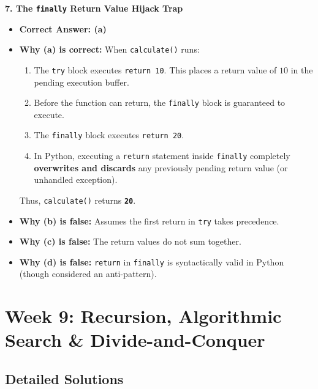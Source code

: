 \textbf{7. The \texttt{finally} Return Value Hijack Trap}
\begin{itemize}
    \item \textbf{Correct Answer: (a)}
    \item \textbf{Why (a) is correct:}
    When \texttt{calculate()} runs:
    \begin{enumerate}
        \item The \texttt{try} block executes \texttt{return 10}. This places a return value of $10$ in the pending execution buffer.
        \item Before the function can return, the \texttt{finally} block is guaranteed to execute.
        \item The \texttt{finally} block executes \texttt{return 20}.
        \item In Python, executing a \texttt{return} statement inside \texttt{finally} completely \textbf{overwrites and discards} any previously pending return value (or unhandled exception).
    \end{enumerate}
    Thus, \texttt{calculate()} returns \textbf{\texttt{20}}.
    \item \textbf{Why (b) is false:} Assumes the first return in \texttt{try} takes precedence.
    \item \textbf{Why (c) is false:} The return values do not sum together.
    \item \textbf{Why (d) is false:} \texttt{return} in \texttt{finally} is syntactically valid in Python (though considered an anti-pattern).
\end{itemize}

\section*{Week 9: Recursion, Algorithmic Search \& Divide-and-Conquer}

\subsection*{Detailed Solutions}

